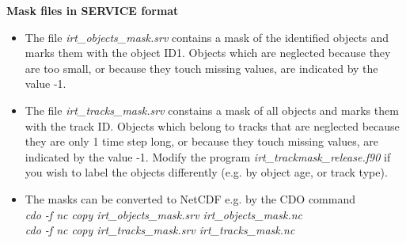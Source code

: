 \documentclass[11pt]{article}
\begin{document}
{\bf Mask files in SERVICE format}\\
\begin{itemize}
\item The file {\it irt\_objects\_mask.srv} contains a mask of the identified objects and marks them with the object ID1. Objects which are neglected because they are too small, or because they touch missing values, are indicated by the value -1.
\item The file {\it irt\_tracks\_mask.srv} constains a mask of all objects and marks them with the track ID. Objects which belong to tracks that are neglected because they are only 1 time step long, or because they touch missing values, are indicated by the value -1. Modify the program {\it irt\_trackmask\_release.f90} if you wish to label the objects differently (e.g. by object age, or track type).
\item The masks can be converted to NetCDF e.g. by the CDO command\\
{\it cdo -f nc copy irt\_objects\_mask.srv irt\_objects\_mask.nc}\\
{\it cdo -f nc copy irt\_tracks\_mask.srv irt\_tracks\_mask.nc}
\end{itemize}
\end{document}
